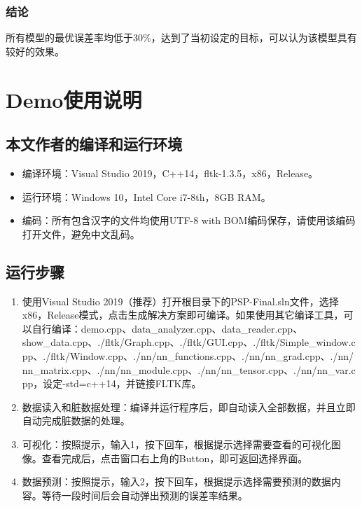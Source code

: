 \documentclass[CJK]{ctexart}
\begin{document}
\subsubsection{结论}
所有模型的最优误差率均低于30\%，达到了当初设定的目标，可以认为该模型具有较好的效果。
\section{Demo使用说明}
\subsection{本文作者的编译和运行环境}
\begin{itemize}
    \item 编译环境：Visual Studio 2019，C++14，fltk-1.3.5，x86，Release。
    \item 运行环境：Windows 10，Intel Core i7-8th，8GB RAM。
    \item 编码：所有包含汉字的文件均使用UTF-8 with BOM编码保存，请使用该编码打开文件，避免中文乱码。
\end{itemize}
\subsection{运行步骤}
\begin{enumerate}
    \item 使用Visual Studio 2019（推荐）打开根目录下的PSP-Final.sln文件，选择x86，Release模式，点击生成解决方案即可编译。如果使用其它编译工具，可以自行编译：demo.cpp、data\_analyzer.cpp、data\_reader.cpp、show\_data.cpp、./fltk/Graph.cpp、./fltk/GUI.cpp、./fltk/Simple\_window.cpp、./fltk/Window.cpp、./nn/nn\_functions.cpp、./nn/nn\_grad.cpp、./nn/nn\_matrix.cpp、./nn/nn\_module.cpp、./nn/nn\_tensor.cpp、./nn/nn\_var.cpp，设定-std=c++14，并链接FLTK库。
    \item 数据读入和脏数据处理：编译并运行程序后，即自动读入全部数据，并且立即自动完成脏数据的处理。
    \item 可视化：按照提示，输入1，按下回车，根据提示选择需要查看的可视化图像。查看完成后，点击窗口右上角的Button，即可返回选择界面。
    \item 数据预测：按照提示，输入2，按下回车，根据提示选择需要预测的数据内容。等待一段时间后会自动弹出预测的误差率结果。
\end{enumerate}
\end{document}
